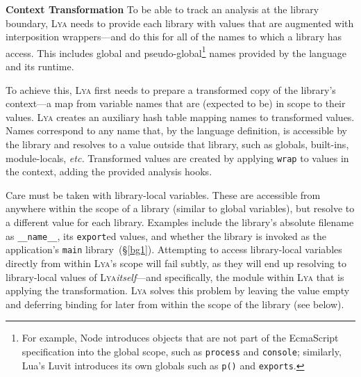 \documentclass[letterpaper,twocolumn,10pt]{article}
\def\etc{{\em etc.}\xspace}
\newcommand{\heading}[1]{\vspace{2pt}\noindent\textbf{#1}\enspace}
\newcommand{\ttt}[1]{\texttt{#1}}
\newcommand{\ttiny}[1]{\texttt{\footnotesize #1}}
\newcommand{\sx}[1]{(\S\ref{#1})}
\newcommand{\sys}{{\scshape Lya}\xspace}
\begin{document}
\heading{Context Transformation}
To be able to track an analysis at the library boundary, \sys needs to provide each library with values that are augmented with interposition wrappers---and do this for all of the names to which a library has access.
This includes global and pseudo-global\footnote{
  For example, Node introduces objects that are not part of the EcmaScript specification into the global scope, such as \ttiny{process} and \ttiny{console};
  similarly, Lua's Luvit introduces its own globals such as \ttiny{p()} and \ttiny{exports}.
} names provided by the language and its runtime.

To achieve this, \sys first needs to prepare a transformed copy of the library's context---a map from variable names that are (expected to be) in scope to their values.
\sys creates an auxiliary hash table mapping names to transformed values.
Names correspond to any name that, by the language definition, is accessible by the library and resolves to a value outside that library, such as globals, built-ins, module-locals, \etc
Transformed values are created by applying \ttt{wrap} to values in the context, adding the provided analysis hooks.


Care must be taken with library-local variables. %
These are accessible from anywhere within the scope of a library (similar to global variables), but resolve to a different value for each library.
Examples include the library's absolute filename as \ttt{\_\_name\_\_}, its \ttt{export}ed values, and whether the library is invoked as the application's \ttt{main} library~\sx{bg1}.
Attempting to access library-local variables directly from within \sys's scope will fail subtly, as they will end up resolving to library-local values of \sys \emph{itself}---and specifically, the module within \sys that is applying the transformation.
\sys solves this problem by leaving the value empty and deferring binding for later from within the scope of the library (see below).
\end{document}
